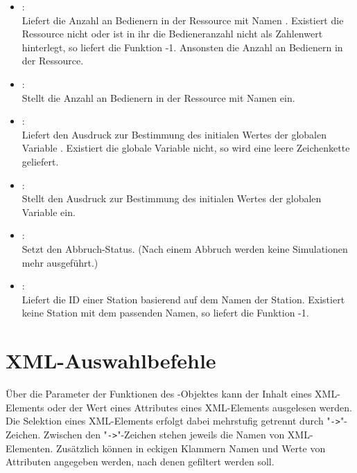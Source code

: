 \begin{itemize}
\item
{}:\\
Liefert die Anzahl an Bedienern in der Ressource mit Namen .
Existiert die Ressource nicht oder ist in ihr die Bedieneranzahl nicht als Zahlenwert
hinterlegt, so liefert die Funktion -1. Ansonsten die Anzahl an Bedienern in der
Ressource.

\item
{}:\\
Stellt die Anzahl an Bedienern in der Ressource mit Namen  ein.

\item
{}:\\
Liefert den Ausdruck zur Bestimmung des initialen Wertes der globalen Variable
. Existiert die globale Variable nicht, so wird
eine leere Zeichenkette geliefert.

\item
{}:\\
Stellt den Ausdruck zur Bestimmung des initialen Wertes der globalen Variable
 ein.

\item
{}:\\
Setzt den Abbruch-Status. (Nach einem Abbruch werden keine Simulationen mehr ausgeführt.)

\item
{}:\\
Liefert die ID einer Station basierend auf dem Namen der Station.
Existiert keine Station mit dem passenden Namen, so liefert die Funktion -1.

\end{itemize}



\chapter{XML-Auswahlbefehle}

Über die Parameter der Funktionen des -Objektes kann der Inhalt eines XML-Elements oder der Wert eines
Attributes eines XML-Elements ausgelesen werden. Die Selektion eines XML-Elements erfolgt dabei mehrstufig
getrennt durch "\texttt{->}"-Zeichen. Zwischen den "\texttt{->}"-Zeichen stehen jeweils die Namen von XML-Elementen.
Zusätzlich können in eckigen Klammern Namen und Werte von Attributen angegeben werden, nach denen gefiltert werden soll.

